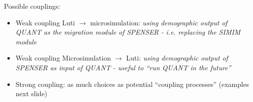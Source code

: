 \documentclass[english,11pt,usenames,dvipsnames]{beamer}
\begin{document}
{%

Possible couplings:

\medskip

\begin{itemize}
	\item Weak coupling Luti $\rightarrow$ microsimulation: \textit{using demographic output of QUANT as the migration module of SPENSER - i.e. replacing the SIMIM module}
	\item Weak coupling Microsimulation $\rightarrow$ Luti: \textit{using demographic output of SPENSER as input of QUANT - useful to ``run QUANT in the future''}
	\item Strong coupling: as much choices as potential ``coupling processes'' (examples next slide)
\end{itemize}


}
\end{document}
